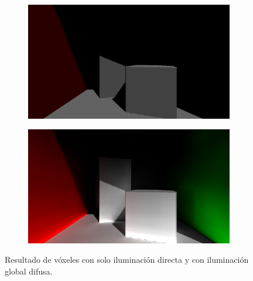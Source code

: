 \begin{figure}[H]
\begin{subfigure}[t]{0.35\textwidth}
	\end{subfigure}%
	\par\smallskip
	\begin{subfigure}[t]{0.35\textwidth}
		\centering
		\includegraphics[width=\linewidth]{media/c_voxel_direct.png}
	\end{subfigure}%
	\hspace{0.05\textwidth}
	\begin{subfigure}[t]{0.35\textwidth}
		\centering
		\includegraphics[width=\linewidth]{media/c_voxel_gi.png}
	\end{subfigure}%
	\caption{Resultado de vóxeles con solo iluminación directa y con iluminación global difusa.}
	\label{fig:vgi_scenes}
\end{figure}
